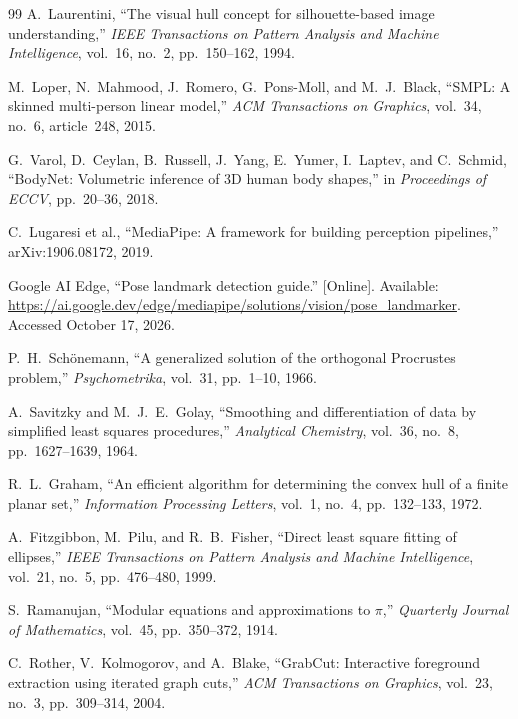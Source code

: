 \documentclass[11pt,a4paper]{article}
\numberwithin{equation}{section}
\begin{document}
\begin{thebibliography}{99}
\small
\setlength{\itemsep}{0.35em}
\setlength{\parskip}{0pt}
A.~Laurentini, ``The visual hull concept for silhouette-based image understanding,'' \emph{IEEE Transactions on Pattern Analysis and Machine Intelligence}, vol.~16, no.~2, pp.~150--162, 1994.

M.~Loper, N.~Mahmood, J.~Romero, G.~Pons-Moll, and M.~J.~Black, ``SMPL: A skinned multi-person linear model,'' \emph{ACM Transactions on Graphics}, vol.~34, no.~6, article~248, 2015.

G.~Varol, D.~Ceylan, B.~Russell, J.~Yang, E.~Yumer, I.~Laptev, and C.~Schmid, ``BodyNet: Volumetric inference of 3D human body shapes,'' in \emph{Proceedings of ECCV}, pp.~20--36, 2018.

C.~Lugaresi et al., ``MediaPipe: A framework for building perception pipelines,'' arXiv:1906.08172, 2019.

Google AI Edge, ``Pose landmark detection guide.'' [Online]. Available: \url{https://ai.google.dev/edge/mediapipe/solutions/vision/pose_landmarker}. Accessed October 17, 2026.

P.~H.~Sch\"onemann, ``A generalized solution of the orthogonal Procrustes problem,'' \emph{Psychometrika}, vol.~31, pp.~1--10, 1966.

A.~Savitzky and M.~J.~E.~Golay, ``Smoothing and differentiation of data by simplified least squares procedures,'' \emph{Analytical Chemistry}, vol.~36, no.~8, pp.~1627--1639, 1964.

R.~L.~Graham, ``An efficient algorithm for determining the convex hull of a finite planar set,'' \emph{Information Processing Letters}, vol.~1, no.~4, pp.~132--133, 1972.

A.~Fitzgibbon, M.~Pilu, and R.~B.~Fisher, ``Direct least square fitting of ellipses,'' \emph{IEEE Transactions on Pattern Analysis and Machine Intelligence}, vol.~21, no.~5, pp.~476--480, 1999.

S.~Ramanujan, ``Modular equations and approximations to $\pi$,'' \emph{Quarterly Journal of Mathematics}, vol.~45, pp.~350--372, 1914.

C.~Rother, V.~Kolmogorov, and A.~Blake, ``GrabCut: Interactive foreground extraction using iterated graph cuts,'' \emph{ACM Transactions on Graphics}, vol.~23, no.~3, pp.~309--314, 2004.


\end{thebibliography}
\end{document}
